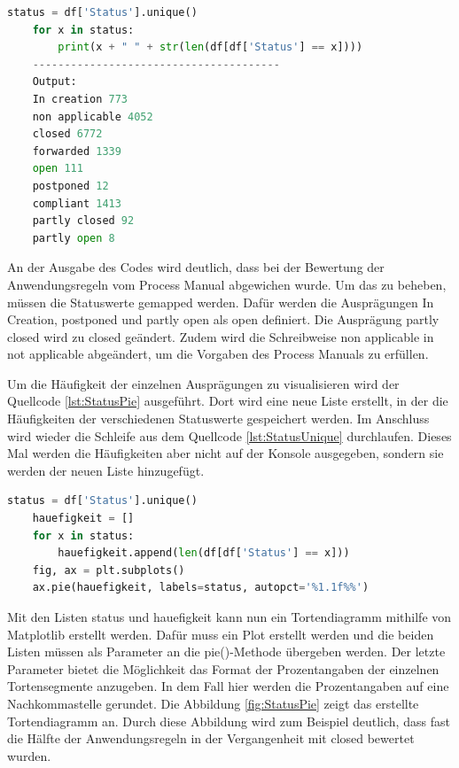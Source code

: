 \begin{lstlisting}[language = python, caption={Häufigkeit der Ausprägungen von Status bestimmen},captionpos=b, label = lst:StatusUnique, floatplacement=H]
    status = df['Status'].unique()
    for x in status:
        print(x + " " + str(len(df[df['Status'] == x])))
    ---------------------------------------
    Output:
    In creation 773
    non applicable 4052
    closed 6772
    forwarded 1339
    open 111
    postponed 12
    compliant 1413
    partly closed 92
    partly open 8
\end{lstlisting}

An der Ausgabe des Codes wird deutlich, dass bei der Bewertung der Anwendungsregeln vom Process Manual abgewichen wurde. Um das zu beheben, müssen die Statuswerte gemapped werden.
Dafür werden die Ausprägungen \glqq In Creation\grqq{}, \glqq postponed\grqq{} und \glqq partly open\grqq{} als \glqq open\grqq{} definiert.
Die Ausprägung \glqq partly closed\grqq{} wird zu \glqq closed\grqq{} geändert. Zudem wird die Schreibweise \glqq non applicable\grqq{} in \glqq not applicable\grqq{} abgeändert,
um die Vorgaben des Process Manuals zu erfüllen. 

Um die Häufigkeit der einzelnen Ausprägungen zu visualisieren wird der Quellcode \ref*{lst:StatusPie} ausgeführt.
Dort wird eine neue Liste erstellt, in der die Häufigkeiten der verschiedenen Statuswerte gespeichert werden.
Im Anschluss wird wieder die Schleife aus dem Quellcode \ref*{lst:StatusUnique} durchlaufen. Dieses Mal werden die Häufigkeiten aber nicht auf der Konsole ausgegeben,
sondern sie werden der neuen Liste hinzugefügt.

\begin{lstlisting}[language = python, caption={Visualisierung des Attributs Status},captionpos=b, label = lst:StatusPie, floatplacement=H]
    status = df['Status'].unique()
    hauefigkeit = []
    for x in status:
        hauefigkeit.append(len(df[df['Status'] == x]))
    fig, ax = plt.subplots()
    ax.pie(hauefigkeit, labels=status, autopct='%1.1f%%')
\end{lstlisting}

Mit den Listen \glqq status\grqq{} und \glqq hauefigkeit\grqq{} kann nun ein Tortendiagramm mithilfe von Matplotlib erstellt werden.
Dafür muss ein Plot erstellt werden und die beiden Listen müssen als Parameter an die pie()-Methode übergeben werden.
Der letzte Parameter bietet die Möglichkeit das Format der Prozentangaben der einzelnen Tortensegmente anzugeben. In dem Fall hier werden die Prozentangaben auf eine Nachkommastelle
gerundet. Die Abbildung \ref*{fig:StatusPie} zeigt das erstellte Tortendiagramm an. Durch diese Abbildung wird zum Beispiel deutlich, dass fast die Hälfte der 
Anwendungsregeln in der Vergangenheit mit \glqq closed\grqq{} bewertet wurden.

